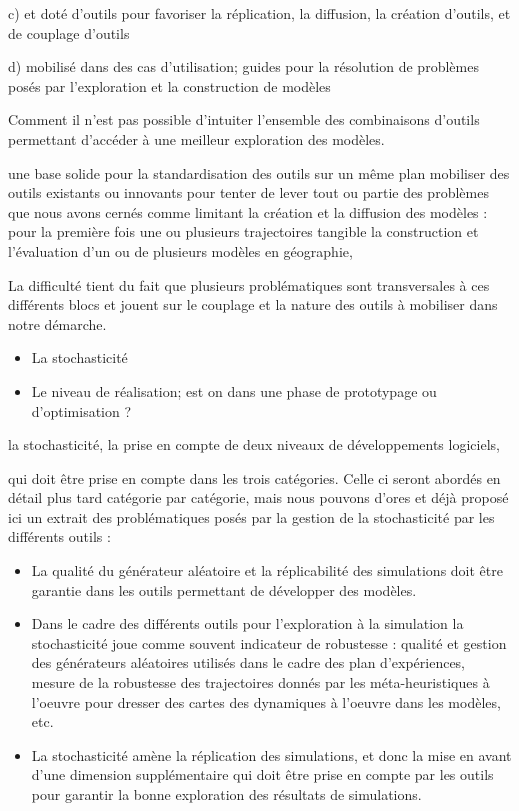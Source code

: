 c) et doté d'outils pour favoriser la réplication, la diffusion, la création d'outils, et de couplage d'outils

d) mobilisé dans des cas d'utilisation; guides pour la résolution de problèmes posés par l'exploration et la construction de modèles

Comment il n'est pas possible d'intuiter l'ensemble des combinaisons d'outils permettant d'accéder à une meilleur exploration des modèles.

une base solide pour la standardisation des outils sur un même plan mobiliser des outils existants ou innovants pour tenter de lever tout ou partie des problèmes que nous avons cernés comme limitant la création et la diffusion des modèles : 
pour la première fois une ou plusieurs trajectoires tangible la construction et l'évaluation d'un ou de plusieurs modèles en géographie, 



La difficulté tient du fait que plusieurs problématiques sont transversales à ces différents blocs et jouent sur le couplage et la nature des outils à mobiliser dans notre démarche.

\begin{itemize}
\item La stochasticité 
\item Le niveau de réalisation; est on dans une phase de prototypage ou d'optimisation ?
\end{itemize}

la stochasticité, la prise en compte de deux niveaux de développements logiciels, 

  qui doit être prise en compte dans les trois catégories. Celle ci seront abordés en détail plus tard catégorie par catégorie, mais nous pouvons d'ores et déjà proposé ici un extrait des problématiques posés par la gestion de la stochasticité par les différents outils : 

\begin{itemize}
\item La qualité du générateur aléatoire et la réplicabilité des simulations doit être garantie dans les outils permettant de développer des modèles.
\item Dans le cadre des différents outils pour l'exploration à la simulation la stochasticité joue comme souvent indicateur de robustesse : qualité et gestion des générateurs aléatoires utilisés dans le cadre des plan d'expériences, mesure de la robustesse des trajectoires donnés par les méta-heuristiques à l'oeuvre pour dresser des cartes des dynamiques à l'oeuvre dans les modèles, etc.  
\item La stochasticité amène la réplication des simulations, et donc la mise en avant d'une dimension supplémentaire qui doit être prise en compte par les outils pour garantir la bonne exploration des résultats de simulations. 
\end{itemize}

